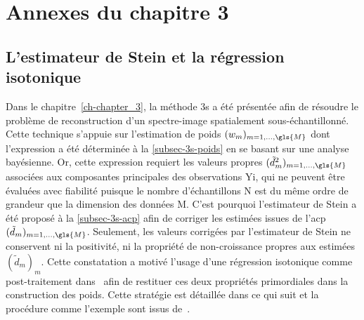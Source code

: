 \chapter{Annexes du chapitre 3}\label{annexe-2}
\dochaptoc

    \section{L'estimateur de Stein et la régression isotonique}\label{abstr-regression-isotonique}
    
    Dans le chapitre~\ref{ch-chapter_3}, la méthode \gls{3s} a été présentée afin de résoudre le problème de reconstruction d'un spectre-image spatialement sous-échantillonné. Cette technique s'appuie sur l'estimation de poids $(w_m)_{m=1,\dots,\gls{M}}$ dont l'expression a été déterminée à la \cref{subsec-3s-poids} en se basant sur une analyse bayésienne. Or, cette expression requiert les valeurs propres $(\tilde{d}^2_m)_{m=1,\dots,\gls{M}}$ associées aux composantes principales des observations \gls{Yi}, qui ne peuvent être évaluées avec fiabilité puisque le nombre d'échantillons \gls{N} est du même ordre de grandeur que la dimension des données \gls{M}. C'est pourquoi l'estimateur de Stein a été proposé à la \cref{subsec-3s-acp} afin de corriger les estimées issues de l'\gls{acp} $(\tilde{d}_m)_{m=1,\dots,\gls{M}}$. Seulement, les valeurs corrigées par l'estimateur de Stein ne conservent ni la positivité, ni la propriété de non-croissance propres aux estimées $(\tilde{d}_m)_{m}$. Cette constatation a motivé l'usage d'une régression isotonique comme post-traitement dans~\cite{LinPerl1985} afin de restituer ces deux propriétés primordiales dans la construction des poids. Cette stratégie est détaillée dans ce qui suit et la procédure comme l'exemple sont issus de~\cite{LinPerl1985}.
    
